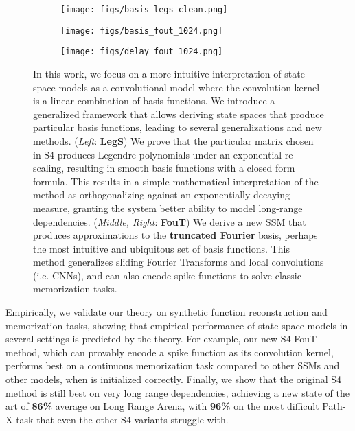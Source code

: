 \documentclass{article}
\begin{document}
\begin{figure}[!t]
  \begin{subfigure}{0.33\linewidth}
    \centering
    \texttt{[image: figs/basis\_legs\_clean.png]}
  \end{subfigure}
  \begin{subfigure}{0.33\linewidth}
    \centering
    \texttt{[image: figs/basis\_fout\_1024.png]}
  \end{subfigure}
  \begin{subfigure}{0.33\linewidth}
    \centering
    \texttt{[image: figs/delay\_fout\_1024.png]}
  \end{subfigure}
  \caption{
    In this work, we focus on a more intuitive interpretation of state space models as a convolutional model where the convolution kernel is a linear combination of basis functions.
    We introduce a generalized framework that allows deriving state spaces  that produce particular basis functions, leading to several generalizations and new methods.
    (\emph{Left}: \textbf{LegS}) We prove that the particular  matrix chosen in S4 produces Legendre polynomials under an exponential re-scaling, resulting in smooth basis functions with a closed form formula.
    This results in a simple mathematical interpretation of the method as orthogonalizing against an exponentially-decaying measure, granting the system better ability to model long-range dependencies.
    (\emph{Middle, Right}: \textbf{FouT})
    We derive a new SSM that produces approximations to the \textbf{truncated Fourier} basis, perhaps the most intuitive and ubiquitous set of basis functions. This method generalizes sliding Fourier Transforms and local convolutions (i.e. CNNs), and can also encode spike functions to solve classic memorization tasks.
  }
  \label{fig:1}
\end{figure}

Empirically, we validate our theory on synthetic function reconstruction and memorization tasks, showing that empirical performance of state space models in several settings is predicted by the theory.
For example, our new S4-FouT method, which can provably encode a spike function as its convolution kernel, performs best on a continuous memorization task compared to other SSMs and other models, when  is initialized correctly.
Finally,
we show that the original S4 method is still best on very long range dependencies, achieving a new state of the art of \textbf{86\%} average on Long Range Arena, with \textbf{96\%} on the most difficult Path-X task that even the other S4 variants struggle with.
\end{document}
